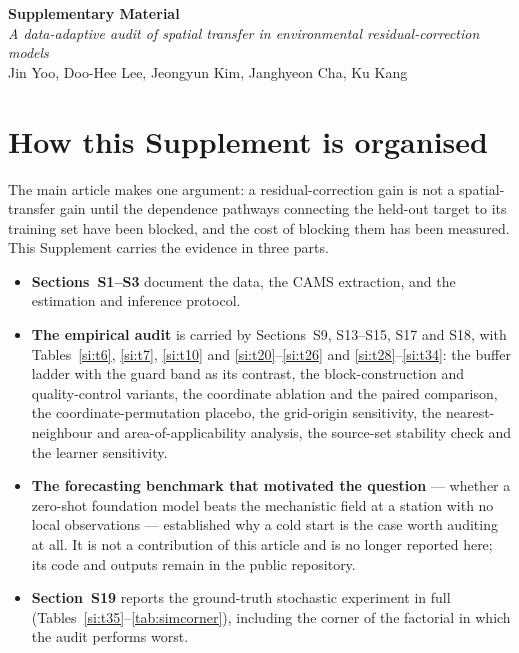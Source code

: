 \documentclass[11pt]{article}
\begin{document}
\begin{center}
{\large\bfseries Supplementary Material}\\[6pt]
{\itshape A data-adaptive audit of spatial transfer in environmental
residual-correction models}\\[4pt]
Jin Yoo, Doo-Hee Lee, Jeongyun Kim, Janghyeon Cha, Ku Kang\\
\end{center}
\vspace{1em}

\section*{How this Supplement is organised}

The main article makes one argument: a residual-correction gain is not a spatial-transfer gain until
the dependence pathways connecting the held-out target to its training set have been blocked, and the
cost of blocking them has been measured. This Supplement carries the evidence in three parts.

\begin{itemize}\itemsep2pt
\item \textbf{Sections~S1--S3} document the data, the CAMS extraction, and the estimation and
      inference protocol.
\item \textbf{The empirical audit} is carried by Sections~S9, S13--S15, S17 and S18, with
      Tables~\ref{si:t6}, \ref{si:t7}, \ref{si:t10} and \ref{si:t20}--\ref{si:t26} and \ref{si:t28}--\ref{si:t34}: the buffer ladder with the guard band as its
      contrast, the block-construction and quality-control variants, the coordinate ablation and the
      paired comparison, the coordinate-permutation placebo, the grid-origin sensitivity, the
      nearest-neighbour and area-of-applicability analysis, the source-set stability check and the
      learner sensitivity.
\item \textbf{The forecasting benchmark that motivated the question} --- whether a
      zero-shot foundation model beats the mechanistic field at a station with no local
      observations --- established why a cold start is the case worth auditing at all. It is not
      a contribution of this article and is no longer reported here; its code and outputs remain
      in the public repository.
\item \textbf{Section~S19} reports the ground-truth stochastic experiment in full
      (Tables~\ref{si:t35}--\ref{tab:simcorner}), including the corner of the factorial in which the audit performs worst.
\end{itemize}
\end{document}
